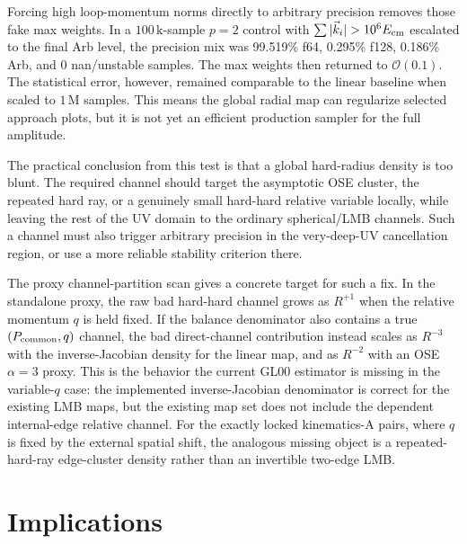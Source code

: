 \documentclass[11pt]{article}
\begin{document}
Forcing high loop-momentum norms directly to arbitrary precision removes those
fake max weights.  In a \(100\,\mathrm{k}\)-sample \(p=2\) control with
\(\sum |\vec k_i| > 10^6 E_{\rm cm}\) escalated to the final Arb level, the
precision mix was 99.519\% f64, 0.295\% f128, 0.186\% Arb, and 0
nan/unstable samples.  The max weights then returned to \(\mathcal{O}(0.1)\).
The statistical error, however, remained comparable to the linear baseline
when scaled to \(1\,\mathrm{M}\) samples.  This means the global radial map can
regularize selected approach plots, but it is not yet an efficient production
sampler for the full amplitude.

The practical conclusion from this test is that a global hard-radius density
is too blunt.  The required channel should target the asymptotic OSE cluster,
the repeated hard ray, or a genuinely small hard-hard relative variable
locally, while leaving the rest of the UV domain to the ordinary
spherical/LMB channels.  Such a channel must also trigger arbitrary precision
in the very-deep-UV cancellation region, or use a more reliable stability
criterion there.

The proxy channel-partition scan gives a concrete target for such a fix.  In
the standalone proxy, the raw bad hard-hard channel grows as \(R^{+1}\) when
the relative momentum \(q\) is held fixed.  If the balance denominator also
contains a true \((P_{\rm common},q)\) channel, the bad direct-channel
contribution instead scales as \(R^{-3}\) with the inverse-Jacobian density
for the linear map, and as \(R^{-2}\) with an OSE \(\alpha=3\) proxy.  This
is the behavior the current GL00 estimator is missing in the variable-\(q\)
case: the implemented inverse-Jacobian denominator is correct for the existing
LMB maps, but the existing map set does not include the dependent
internal-edge relative channel.  For the exactly locked kinematics-A pairs,
where \(q\) is fixed by the external spatial shift, the analogous missing
object is a repeated-hard-ray edge-cluster density rather than an invertible
two-edge LMB.

\section{Implications}
\end{document}
